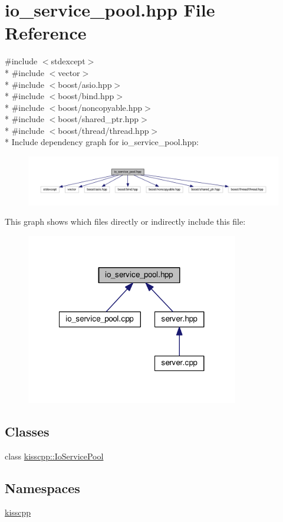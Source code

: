\hypertarget{a00062}{\section{io\-\_\-service\-\_\-pool.\-hpp File Reference}
\label{a00062}
}
{\ttfamily \#include $<$stdexcept$>$}\\*
{\ttfamily \#include $<$vector$>$}\\*
{\ttfamily \#include $<$boost/asio.\-hpp$>$}\\*
{\ttfamily \#include $<$boost/bind.\-hpp$>$}\\*
{\ttfamily \#include $<$boost/noncopyable.\-hpp$>$}\\*
{\ttfamily \#include $<$boost/shared\-\_\-ptr.\-hpp$>$}\\*
{\ttfamily \#include $<$boost/thread/thread.\-hpp$>$}\\*
Include dependency graph for io\-\_\-service\-\_\-pool.\-hpp\-:\nopagebreak
\begin{figure}[H]
\begin{center}
\leavevmode
\includegraphics[width=350pt]{a00108}
\end{center}
\end{figure}
This graph shows which files directly or indirectly include this file\-:\nopagebreak
\begin{figure}[H]
\begin{center}
\leavevmode
\includegraphics[width=263pt]{a00109}
\end{center}
\end{figure}
\subsection*{Classes}
\begin{DoxyCompactItemize}
\item 
class \hyperlink{a00029}{kisscpp\-::\-Io\-Service\-Pool}
\end{DoxyCompactItemize}
\subsection*{Namespaces}
\begin{DoxyCompactItemize}
\item 
\hyperlink{a00089}{kisscpp}
\end{DoxyCompactItemize}
